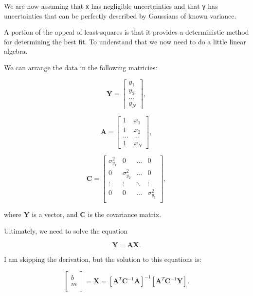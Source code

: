 \documentclass[11pt]{article}
\begin{document}
    We are now assuming that \texttt{x} has negligible uncertainties and
that \texttt{y} has uncertainties that can be perfectly described by
Gaussians of known variance.

    A portion of the appeal of least-squares is that it provides a
deterministic method for determining the best fit. To understand that we
now need to do a little linear algebra.

We can arrange the data in the following matricies:

\[ \mathbf{Y} = \left[ {\begin{array}{c}
            y_1 \\
            y_2 \\
            \dots \\
            y_N
            \end{array}
           }
            \right] , \]

\[ \mathbf{A} = \left[ {\begin{array}{cc}
            1 & x_1 \\
            1 & x_2 \\
            \dots & \dots \\
            1 & x_N
            \end{array}
           }
           \right] ,
           \]

\[ \mathbf{C} = \left[ {\begin{array}{cccc}
            \sigma_{y_1}^2 & 0 & \dots & 0 \\
            0 & \sigma_{y_2}^2 & \dots & 0 \\
            \vdots & \vdots & \ddots & \vdots \\
            0 & 0 & \dots & \sigma_{y_1}^2 \\
            \end{array}
           }
           \right] ,
           \]

where \(\mathbf{Y}\) is a vector, and \(\mathbf{C}\) is the covariance
matrix.

    Ultimately, we need to solve the equation

\[\mathbf{Y} = \mathbf{A}\mathbf{X}.\]

I am skipping the derivation, but the solution to this equations is:

\[ \left[ {\begin{array}{c}
            b \\
            m \\
            \end{array}
           }
            \right] = \mathbf{X} = \left[ \mathbf{A}^T \mathbf{C}^{-1} \mathbf{A}\right]^{-1} \left[ \mathbf{A}^T \mathbf{C}^{-1} \mathbf{Y}\right].\]
\end{document}
